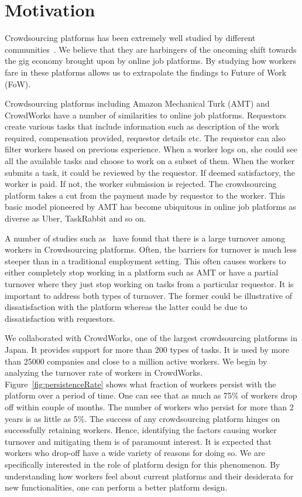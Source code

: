 \section{Motivation}
\label{sec:motivation}

Crowdsourcing platforms has been extremely well studied by different communities~\cite{doan2011crowdsourcing}.
We believe that they are harbingers of the oncoming shift towards the gig economy
brought upon by online job platforms.
By studying how workers fare in these platforms allows us to extrapolate the findings to Future of Work (FoW).

Crowdsourcing platforms including Amazon Mechanical Turk (AMT) and CrowdWorks have a number of similarities
to online job platforms.
Requestors create various tasks that include information such as description of the work required, compensation provided, requestor details etc.
The requestor can also filter workers based on previous experience.
When a worker logs on, she could see all the available tasks and choose to work on a subset of them.
When the worker submits a task, it could be reviewed by the requestor.
If deemed satisfactory, the worker is paid.
If not, the worker submission is rejected.
The crowdsourcing platform takes a cut from the payment made by requestor to the worker.
This basic model pioneered by AMT has become ubiquitous
in online job platforms as diverse as Uber, TaskRabbit and so on.

A number of studies such as~\cite{brawley2016work} have found that there is a large turnover
among workers in Crowdsourcing platforms.
Often, the barriers for turnover is much less steeper than in a traditional employment setting.
This often causes workers to either completely stop working in a platform such as AMT
or have a partial turnover where they just stop working on tasks from a particular requestor.
It is important to address both types of turnover.
The former could be illustrative of dissatisfaction with the platform
whereas the latter could be due to dissatisfaction with requestors.

We collaborated with CrowdWorks, one of the largest crowdsourcing platforms in Japan.
It provides support for more than 200 types of tasks.
It is used by more than 25000 companies and close to a million active workers. 
We begin by analyzing the turnover rate of workers in CrowdWorks. 
Figure~\ref{fig:persistenceRate} shows what fraction of workers
persist with the platform over a period of time.
One can see that as much as 75\% of workers drop off within couple of months.
The number of workers who persist for more than 2 years is as little as 5\%.
The success of any crowdsourcing platform hinges on successfully retaining workers.
Hence, identifying the factors causing worker turnover and mitigating them is of paramount interest.
It is expected that workers who drop-off have a wide variety of reasons for doing so.
We are specifically interested in the role of platform design for this phenomenon.
By understanding how workers feel about current platforms and their desiderata for new functionalities,
one can perform a better platform design. 

